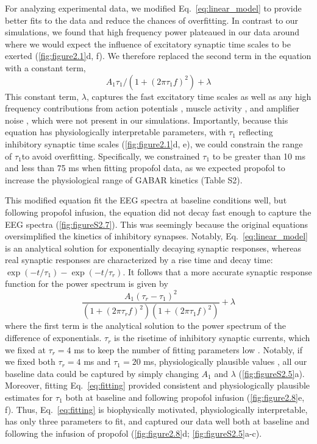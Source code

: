 For analyzing experimental data, we modified Eq.~\ref{eq:linear_model} to provide better fits to the data and reduce the chances of overfitting. In contrast to our simulations, we found that high frequency power plateaued in our data around where we would expect the influence of excitatory synaptic time scales to be exerted (\autoref{fig:figure2.1}d, f). We therefore replaced the second term in the equation with a constant term,
\begin{equation}\label{eq:fitting_no_tau2}
A_1\tau_1/\left(1+\left(2\pi\tau_1f\right)^2\right)+\lambda    
\end{equation}
This constant term, $\lambda$, captures the fast excitatory time scales as well as any high frequency contributions from action potentials \cite{Buzsaki2012}, muscle activity \cite{Muthukumaraswamy2013}, and amplifier noise \cite{Miller2009}, which were not present in our simulations.  Importantly, because this equation has physiologically interpretable parameters, with $\tau_1$ reflecting inhibitory synaptic time scales (\autoref{fig:figure2.1}d, e), we could constrain the range of $\tau_1 $to avoid overfitting. Specifically, we constrained $\tau_1$ to be greater than 10 ms and less than 75 ms when fitting propofol data, as we expected propofol to increase the physiological range of GABAR kinetics (Table S2). 

This modified equation fit the EEG spectra at baseline conditions well, but following propofol infusion, the equation did not decay fast enough to capture the EEG spectra (\autoref{fig:figureS2.7}). This was seemingly because the original equations oversimplified the kinetics of inhibitory synapses. Notably, Eq.~\ref{eq:linear_model} is an analytical solution for exponentially decaying synaptic responses, whereas real synaptic responses are characterized by a rise time and decay time: $\exp{\left(-t/\tau_1\right)}-\exp\left(-t/\tau_r\right)$. It follows that a more accurate synaptic response function for the power spectrum is given by
\begin{equation}\label{eq:fitting}
\frac{A_1\left(\tau_r-\tau_1\right)^2}{\left(1+\left(2\pi\tau_rf\right)^2\right)\left(1+\left(2\pi\tau_1f\right)^2\right)}+\lambda
\end{equation}
where the first term is the analytical solution to the power spectrum of the difference of exponentials. $\tau_r$ is the risetime of inhibitory synaptic currents, which we fixed at $\tau_r=4$ ms to keep the number of fitting parameters low \cite{Sceniak2008}. Notably, if we fixed both $\tau_r=4$ ms and $\tau_1=20$ ms, physiologically plausible values \cite{Sceniak2008}, all our baseline data could be captured by simply changing $A_1$ and $\lambda$ (\autoref{fig:figureS2.5}a). Moreover, fitting Eq.~\ref{eq:fitting} provided consistent and physiologically plausible estimates for $\tau_1$ both at baseline and following propofol infusion (\autoref{fig:figure2.8}e, f). Thus, Eq.~\ref{eq:fitting} is biophysically motivated, physiologically interpretable, has only three parameters to fit, and captured our data well both at baseline and following the infusion of propofol (\autoref{fig:figure2.8}d; \autoref{fig:figureS2.5}a-c). 


